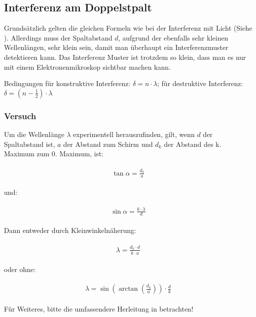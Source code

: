 \subsection{Interferenz am Doppelstpalt}

Grundsätzlich gelten die gleichen Formeln wie bei der Interferenz mit Licht (Siehe ). Allerdings muss der Spaltabstand $d$, aufgrund der ebenfalls sehr kleinen Wellenlängen, sehr klein sein, damit man überhaupt ein Interferenzmuster detektieren kann. Das Interferenz Muster ist trotzdem so klein, dass man es nur mit einem Elektronenmikroskop sichtbar machen kann.

Bedingungen für konstruktive Interferenz: $\delta = n \cdot \lambda$; für destruktive Interferenz: $\delta = (n-\frac{1}{2}) \cdot \lambda$


\subsubsection{Versuch}

Um die Wellenlänge $\lambda$ experimentell herauszufinden, gilt, wenn $d$ der Spaltabstand ist, $a$ der Abstand zum Schirm und $d_k$ der Abstand des k. Maximum zum 0. Maximum, ist:

\begin{align}
\begin{split}
	\tan{\alpha} = \frac{d_k}{a}
\end{split}
\end{align}

\noindent und:

\begin{align}
\begin{split}
	\sin{\alpha} = \frac{k \cdot\lambda}{d}
\end{split}
\end{align}

\noindent Dann entweder durch Kleinwinkelnäherung:

\begin{align}
\begin{split}
	\lambda = \frac{d_k \cdot d}{k \cdot a}
\end{split}
\end{align}

\noindent oder ohne:

\begin{align}
\begin{split}
	\lambda = \sin(\arctan(\frac{d_k}{a})) \cdot \frac{d}{k}
\end{split}
\end{align}


\noindent Für Weiteres, bitte die umfassendere Herleitung in  betrachten!